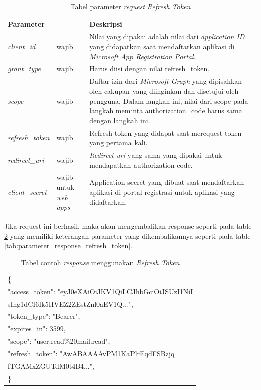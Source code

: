 \begin{table}[H]
	\centering 
	\caption{Tabel parameter \textit{request} \textit{Refresh Token}}
	\label{tab:parameter_request_refresh_token}
	\begin{tabular}{|p{3cm}|p{3cm}|p{9cm}|}
	\toprule
	 \textbf{Parameter} & & \textbf{Deskripsi}\\ \hline 
	\textit{client\_id} & wajib & Nilai yang dipakai adalah nilai dari \textit{application ID} yang didapatkan saat mendaftarkan aplikasi di \textit{Microsoft App Registration Portal}.\\ \hline 
	\textit{grant\_type} & wajib & Harus diisi dengan nilai refresh\_token. \\ \hline
	\textit{scope} & wajib & Daftar izin dari \textit{Microsoft Graph} yang dipisahkan oleh cakupan yang diinginkan dan disetujui oleh pengguna. Dalam langkah ini, nilai dari scope pada langkah meminta authorization\_code harus sama dengan langkah ini.  \\ \hline 
	\textit{refresh\_token} & wajib & Refresh token yang didapat saat merequest token yang pertama kali. \\ \hline  
	\textit{redirect\_uri} & wajib & \textit{Redirect uri} yang sama yang dipakai untuk mendapatkan authorization code. \\ \hline 
	\textit{client\_secret} & wajib untuk \textit{web apps} & Application secret yang dibuat saat mendaftarkan aplikasi di portal registrasi untuk aplikasi yang didaftarkan.\\
	\bottomrule
	\end{tabular}  
\end{table}

Jika request ini berhasil, maka akan mengembalikan response seperti pada table \ref{tab:contoh_response_refresh_token} yang memiliki keterangan parameter yang dikembalikannya seperti pada table \ref{tab:parameter_response_refresh_token}. 
\\
\begin{table}[H]
	\centering 
	\caption{Tabel contoh \textit{response} menggunakan \textit{Refresh Token}}
	\label{tab:contoh_response_refresh_token}
	\begin{tabular}{|p{12cm}|}
	\toprule
	\{\\
    "access\_token": "eyJ0eXAiOiJKV1QiLCJhbGciOiJSUzI1NiI\\
    sIng1dCI6Ik5HVEZ2ZEstZnl0aEV1Q...",\\
    "token\_type": "Bearer",\\
    "expires\_in": 3599,\\
    "scope": "user.read\%20mail.read",\\
    "refresh\_token": "AwABAAAAvPM1KaPlrEqdFSBzjq\\
    fTGAMxZGUTdM0t4B4...",\\
\}\\
	\bottomrule
	\end{tabular}  
\end{table}

